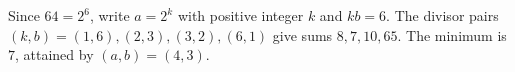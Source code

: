 Since $64=2^6$, write $a=2^k$ with positive integer $k$ and $kb=6$. The divisor pairs $(k,b)=(1,6),(2,3),(3,2),(6,1)$ give sums $8,7,10,65$. The minimum is $\boxed7$, attained by $(a,b)=(4,3)$.
